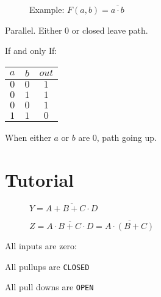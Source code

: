 \documentclass[a4paper,12pt]{article}
\begin{document}
\begin{figure}[hbt] 
\centering 



\label{NAND Gate} 

\end{figure} 

\begin{figure}[h]
\centering 



\label{NAND Gate} 

\caption{Example: $F(a, b) = \overline{a \cdot b}$}

\end{figure}

Parallel. Either $0$ or closed leave path.

If and only If:

\begin{tabular}{|c|c|c|}
\hline
$a$	&	$b$	&	$out$	\\
\hline
$0$	&	$0$	&	$1$	\\
\hline
$0$	&	$1$	&	$1$	\\
\hline
$0$	&	$0$	&	$1$	\\
\hline
$1$	&	$1$	&	$0$	\\
\hline
\end{tabular}

When either $a$ or $b$ are $0$, path going up.

\section*{Tutorial}

\begin{figure}[h]
\centering 



\caption{$Y = \overline{A + B + C \cdot D}$}

\end{figure}

\begin{figure}[h]
\centering 



\caption{$Z = \overline{A \cdot B + C \cdot D} = \overline{A \cdot (B + C)} $}

\end{figure}

All inputs are zero:

All pullups are \verb!CLOSED!

All pull downs are \verb!OPEN!
\end{document}

